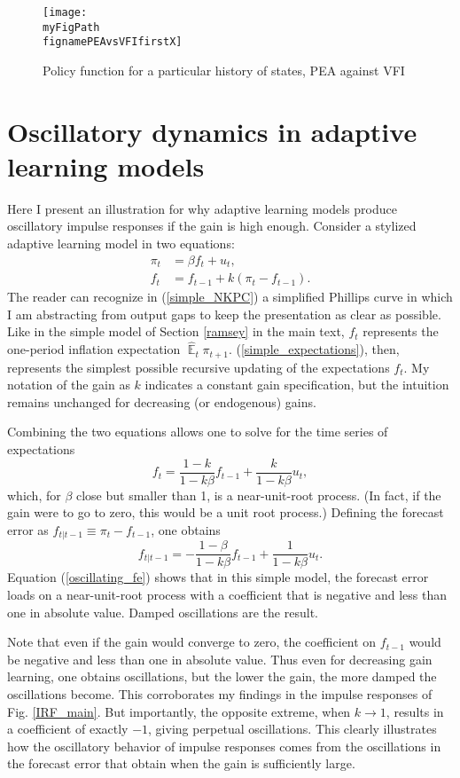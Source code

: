 \documentclass[11pt]{article}
\def \myFigPath {../../figures/}
\renewcommand{\[}{\begin{equation}}
\renewcommand{\]}{\end{equation}}
\DeclareMathOperator{\E}{\mathbb{E}}
\def\fignamePEAvsVFIfirstX{compare_value_pea_results_approx_value_outputs_approx17_Sep_2020_14_01_16_pea_outputs_approx17_Sep_2020_13_47_33_pretty_19_Sep_2020_09_30_01}
\begin{document}
\begin{figure}[h!]
\texttt{[image: \\myFigPath \\fignamePEAvsVFIfirstX]}
\caption{Policy function for a particular history of states, PEA against VFI}
\label{compare_pea_vfi}
\end{figure}


\section{Oscillatory dynamics in adaptive learning models} \label{app_oscillations}
Here I present an illustration for why adaptive learning models produce oscillatory impulse responses if the gain is high enough. Consider a stylized adaptive learning model in two equations:
\begin{align}
\pi_t & = \beta f_t + u_t \label{simple_NKPC}, \\
f_t & = f_{t-1} + k(\pi_t - f_{t-1}) \label{simple_expectations}.
\end{align}
The reader can recognize in (\ref{simple_NKPC}) a simplified Phillips curve in which I am abstracting from output gaps to keep the presentation as clear as possible. Like in the simple model of Section \ref{ramsey} in the main text, $f_t$ represents the one-period inflation expectation $\hat{\E}_t \pi_{t+1}$. (\ref{simple_expectations}), then, represents the simplest possible recursive updating of the expectations $f_t$. My notation of the gain as $k$ indicates a constant gain specification, but the intuition remains unchanged for decreasing (or endogenous) gains. 

Combining the two equations allows one to solve for the time series of expectations
\begin{equation}
f_t = \frac{1-k}{1-k\beta}f_{t-1} + \frac{k}{1-k\beta}u_t,
\end{equation}
which, for $\beta$ close but smaller than 1, is a near-unit-root process. (In fact, if the gain were to go to zero, this would be a unit root process.) Defining the forecast error as $f_{t|t-1} \equiv \pi_t - f_{t-1}$, one obtains
\begin{equation}
f_{t|t-1} = -\frac{1-\beta}{1-k\beta}f_{t-1} + \frac{1}{1-k\beta}u_t \label{oscillating_fe}.
\end{equation}
Equation (\ref{oscillating_fe}) shows that in this simple model, the forecast error loads on a near-unit-root process with a coefficient that is negative and less than one in absolute value. Damped oscillations are the result. 

Note that even if the gain would converge to zero, the coefficient on $f_{t-1}$ would be negative and less than one in absolute value. Thus even for decreasing gain learning, one obtains oscillations, but the lower the gain, the more damped the oscillations become. This corroborates my findings in the impulse responses of Fig. \ref{IRF_main}. But importantly, the opposite extreme, when $k\rightarrow 1$, results in a coefficient of exactly $-1$, giving perpetual oscillations. This clearly illustrates how the oscillatory behavior of impulse responses comes from the oscillations in the forecast error that obtain when the gain is sufficiently large. 
\end{document}
